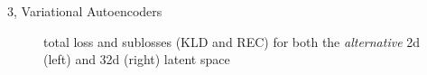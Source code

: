 \documentclass[10pt,a4paper]{article}
\begin{document}
\begin{task}{3, Variational Autoencoders}
\begin{figure}\centering
{} \hspace{1.5cm}
\caption{total loss and sublosses (KLD and REC) for both the \textit{alternative} 2d (left) and 32d (right) latent space}
\label{fig:loss-alternative}
\end{figure}
\end{task}
\end{document}
